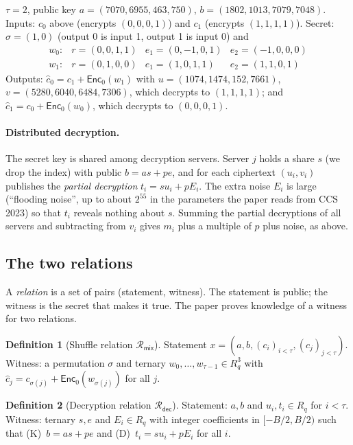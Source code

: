 \documentclass[11pt,a4paper]{article}
\newcommand{\Rq}{R_q}
\newcommand{\EncZ}{\mathsf{Enc}_0}
\newcommand{\Rmix}{\mathcal{R}_{\mathsf{mix}}}
\newcommand{\Rdec}{\mathcal{R}_{\mathsf{dec}}}
\newcommand{\ch}{\hat{c}}
\theoremstyle{definition}
\newtheorem{definition}{Definition}[section]
\theoremstyle{plain}
\begin{document}
\begin{toyrun}
$\tau=2$, public key $a=(7070,6955,463,750)$, $b=(1802,1013,7079,7048)$.
Inputs: $c_0$ above (encrypts $(0,0,0,1)$) and $c_1$ (encrypts $(1,1,1,1)$).
Secret: $\sigma=(1,0)$ (output 0 is input 1, output 1 is input 0) and
\[
\begin{array}{llll}
w_0:& r=(0,0,1,1) & e_1=(0,-1,0,1) & e_2=(-1,0,0,0)\\
w_1:& r=(0,1,0,0) & e_1=(1,0,1,1)  & e_2=(1,1,0,1)
\end{array}
\]
Outputs: $\ch_0=c_1+\EncZ(w_1)$ with $u=(1074,1474,152,7661)$, $v=(5280,6040,6484,7306)$, which
decrypts to $(1,1,1,1)$; and $\ch_1=c_0+\EncZ(w_0)$, which decrypts to $(0,0,0,1)$.
\end{toyrun}

\paragraph{Distributed decryption.} The secret key is shared among decryption servers. Server
$j$ holds a share $s$ (we drop the index) with public $b=as+pe$, and for each ciphertext
$(u_i,v_i)$ publishes the \emph{partial decryption} $t_i=su_i+pE_i$. The extra noise $E_i$ is large
(``flooding noise'', up to about $2^{55}$ in the parameters the paper reads from CCS 2023) so that
$t_i$ reveals nothing about $s$. Summing the partial decryptions of all servers and subtracting
from $v_i$ gives $m_i$ plus a multiple of $p$ plus noise, as above.

\subsection{The two relations}
\label{sec:relations}

A \emph{relation} is a set of pairs (statement, witness). The statement is public; the witness is
the secret that makes it true. The paper proves knowledge of a witness for two relations.

\begin{definition}[Shuffle relation $\Rmix$]
Statement $x=(a,b,(c_i)_{i<\tau},(\ch_j)_{j<\tau})$. Witness: a permutation $\sigma$ and ternary
$w_0,\dots,w_{\tau-1}\in\Rq^3$ with $\ch_j=c_{\sigma(j)}+\EncZ(w_{\sigma(j)})$ for all $j$.
\end{definition}

\begin{definition}[Decryption relation $\Rdec$]
Statement: $a,b$ and $u_i,t_i\in\Rq$ for $i<\tau$. Witness: ternary $s,e$ and $E_i\in\Rq$ with integer
coefficients in $[-B/2,B/2)$ such that (K)~$b=as+pe$ and (D)~$t_i=su_i+pE_i$ for all $i$.
\end{definition}
\end{document}
